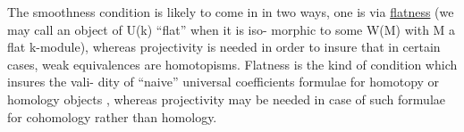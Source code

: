 The smoothness condition is likely to come in in two ways,  one
is via \uline{flatness}  (we may call an object of U(k) ``flat'' when it is iso-%
morphic to some W(M) with M a flat k-module),  whereas projectivity is
needed in order to insure that in certain cases,  weak equivalences are
homotopisms.  Flatness is the kind of condition which insures the vali-%
dity of ``naive'' universal coefficients formulae for homotopy or homology
objects ,  whereas projectivity may be needed in case of such formulae
for cohomology rather than homology.


